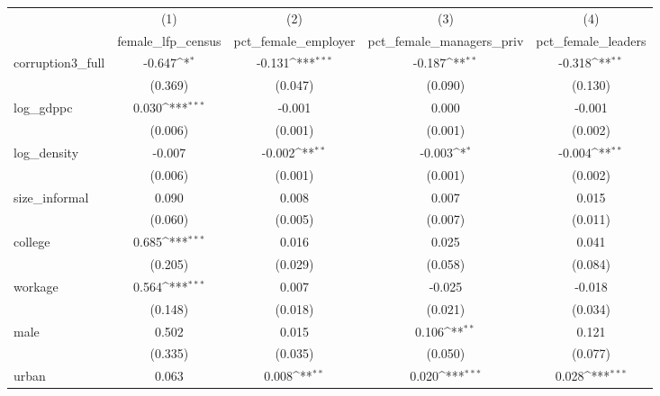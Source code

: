 {
\def\sym#1{\ifmmode^{#1}\else\(^{#1}\)\fi}
\begin{tabular}{l*{4}{c}}
\hline\hline
            &\multicolumn{1}{c}{(1)}&\multicolumn{1}{c}{(2)}&\multicolumn{1}{c}{(3)}&\multicolumn{1}{c}{(4)}\\
            &\multicolumn{1}{c}{female\_lfp\_census}&\multicolumn{1}{c}{pct\_female\_employer}&\multicolumn{1}{c}{pct\_female\_managers\_priv}&\multicolumn{1}{c}{pct\_female\_leaders}\\
\hline
corruption3\_full&      -0.647\sym{*}  &      -0.131\sym{***}&      -0.187\sym{**} &      -0.318\sym{**} \\
            &     (0.369)         &     (0.047)         &     (0.090)         &     (0.130)         \\
[1em]
log\_gdppc   &       0.030\sym{***}&      -0.001         &       0.000         &      -0.001         \\
            &     (0.006)         &     (0.001)         &     (0.001)         &     (0.002)         \\
[1em]
log\_density &      -0.007         &      -0.002\sym{**} &      -0.003\sym{*}  &      -0.004\sym{**} \\
            &     (0.006)         &     (0.001)         &     (0.001)         &     (0.002)         \\
[1em]
size\_informal&       0.090         &       0.008         &       0.007         &       0.015         \\
            &     (0.060)         &     (0.005)         &     (0.007)         &     (0.011)         \\
[1em]
college     &       0.685\sym{***}&       0.016         &       0.025         &       0.041         \\
            &     (0.205)         &     (0.029)         &     (0.058)         &     (0.084)         \\
[1em]
workage     &       0.564\sym{***}&       0.007         &      -0.025         &      -0.018         \\
            &     (0.148)         &     (0.018)         &     (0.021)         &     (0.034)         \\
[1em]
male        &       0.502         &       0.015         &       0.106\sym{**} &       0.121         \\
            &     (0.335)         &     (0.035)         &     (0.050)         &     (0.077)         \\
[1em]
urban       &       0.063         &       0.008\sym{**} &       0.020\sym{***}&       0.028\sym{***}\\

\end{tabular}}

